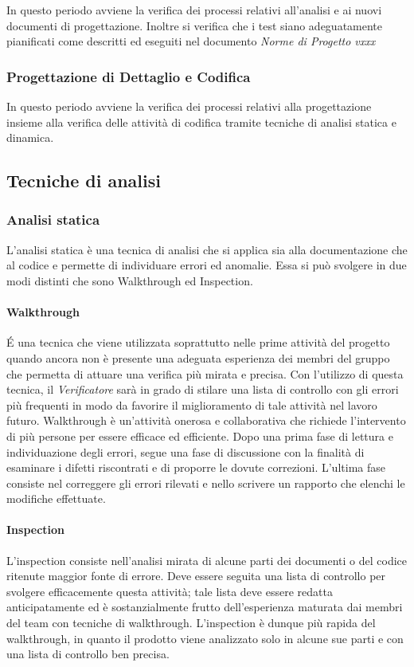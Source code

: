 In questo periodo avviene la verifica dei processi relativi all'analisi e
ai nuovi documenti di progettazione. Inoltre si verifica che i test
siano adeguatamente pianificati come descritti ed eseguiti nel documento \emph{Norme
  di Progetto vxxx}

\subsubsection{Progettazione di Dettaglio e Codifica}

In questo periodo avviene la verifica dei processi relativi alla
progettazione insieme alla verifica delle attività di codifica tramite
tecniche di analisi statica e dinamica.



\subsection{Tecniche di analisi}

\subsubsection{Analisi statica}
L’analisi statica è una tecnica di analisi che si applica sia alla
documentazione che al codice e permette di individuare errori ed
anomalie. Essa si può svolgere in due modi distinti che sono Walkthrough ed
Inspection.

\paragraph{Walkthrough}
\'E una tecnica che viene utilizzata soprattutto nelle prime attività
del progetto quando ancora non è presente una adeguata esperienza dei
membri del gruppo che permetta di attuare una verifica più
mirata e precisa.
Con l’utilizzo di questa tecnica, il \emph{Verificatore} sarà in grado
di stilare una lista di controllo con gli errori più frequenti in modo
da favorire il miglioramento di tale attività nel lavoro futuro.
Walkthrough è un’attività onerosa e collaborativa che richiede
l’intervento di più persone per essere efficace ed efficiente. Dopo
una prima fase di lettura e individuazione degli errori, segue una
fase di discussione con la finalità di esaminare i difetti riscontrati
e di proporre le dovute correzioni. L’ultima fase consiste nel
correggere gli errori rilevati e nello scrivere un rapporto che
elenchi le modifiche effettuate.


\paragraph{Inspection}
L’inspection consiste nell’analisi mirata di alcune parti dei
documenti o del codice ritenute maggior fonte di errore. Deve essere
seguita una lista di controllo per svolgere efficacemente questa
attività; tale lista deve essere redatta anticipatamente ed è
sostanzialmente frutto dell’esperienza maturata dai membri del team
con tecniche di walkthrough. L’inspection è dunque più rapida del
walkthrough, in quanto il prodotto viene analizzato solo in alcune
sue parti e con una lista di controllo ben precisa.

